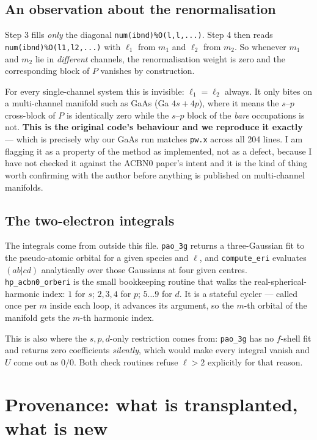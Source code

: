 \documentclass[11pt,a4paper]{article}
\newcommand{\C}[1]{\texttt{\small #1}}
\begin{document}
\subsection{An observation about the renormalisation}

Step 3 fills \emph{only} the diagonal \C{num(ibnd)\%O(l,l,...)}. Step 4 then
reads \C{num(ibnd)\%O(l1,l2,...)} with $\ell_1$ from $m_1$ and $\ell_2$ from
$m_2$. So whenever $m_1$ and $m_2$ lie in \emph{different} channels, the
renormalisation weight is zero and the corresponding block of $P$ vanishes by
construction.

For every single-channel system this is invisible: $\ell_1 = \ell_2$ always. It
only bites on a multi-channel manifold such as GaAs (Ga $4s+4p$), where it means
the $s$--$p$ cross-block of $P$ is identically zero while the $s$--$p$ block of
the \emph{bare} occupations is not. \textbf{This is the original code's
behaviour and we reproduce it exactly} --- which is precisely why our GaAs run
matches \C{pw.x} across all 204 lines. I am flagging it as a property of the
method as implemented, not as a defect, because I have not checked it against
the ACBN0 paper's intent and it is the kind of thing worth confirming with the
author before anything is published on multi-channel manifolds.

\subsection{The two-electron integrals}

The integrals come from outside this file. \C{pao_3g} returns a three-Gaussian
fit to the pseudo-atomic orbital for a given species and $\ell$, and
\C{compute_eri} evaluates $(ab|cd)$ analytically over those Gaussians at four
given centres. \C{hp_acbn0_orberi} is the small bookkeeping routine that walks
the real-spherical-harmonic index: $1$ for $s$; $2,3,4$ for $p$; $5\ldots 9$ for
$d$. It is a stateful cycler --- called once per $m$ inside each loop, it
advances its argument, so the $m$-th orbital of the manifold gets the $m$-th
harmonic index.

This is also where the $s,p,d$-only restriction comes from: \C{pao_3g} has no
$f$-shell fit and returns zero coefficients \emph{silently}, which would make
every integral vanish and $U$ come out as $0/0$. Both check routines refuse
$\ell > 2$ explicitly for that reason.

\section{Provenance: what is transplanted, what is new}
\end{document}

